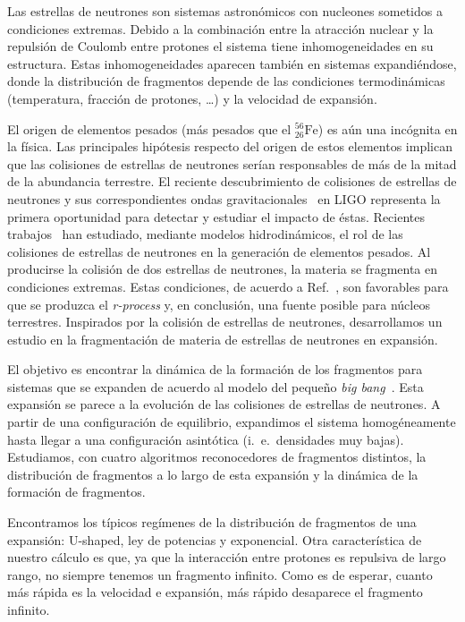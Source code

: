 Las estrellas de neutrones son sistemas astronómicos con nucleones sometidos a condiciones extremas.
Debido a la combinación entre la atracción nuclear y la repulsión de Coulomb entre protones el sistema tiene inhomogeneidades en su estructura.
Estas inhomogeneidades aparecen también en sistemas expandiéndose, donde la distribución de fragmentos depende de las condiciones termodinámicas (temperatura, fracción de protones, \ldots) y la velocidad de expansión.

El origen de elementos pesados (más pesados que el $^{56}_{26}\text{Fe}$) es aún una incógnita en la física.
Las principales hipótesis respecto del origen de estos elementos implican que las colisiones de estrellas de neutrones serían responsables de más de la mitad de la abundancia terrestre.
El reciente descubrimiento de colisiones de estrellas de neutrones y sus correspondientes ondas gravitacionales~\cite{ligo_scientific_collaboration_and_virgo_collaboration_gw170817:_2017} en LIGO representa la primera oportunidad para detectar y estudiar el impacto de éstas.
Recientes trabajos~\cite{kasen_origin_2017} han estudiado, mediante modelos hidrodinámicos, el rol de las colisiones de estrellas de neutrones en la generación de elementos pesados.
Al producirse la colisión de dos estrellas de neutrones, la materia se fragmenta en condiciones extremas.
Estas condiciones, de acuerdo a Ref.~\cite{lattimer_black-hole-neutron-star_1974}, son favorables para que se produzca el \emph{r-process} y, en conclusión, una fuente posible para núcleos terrestres.
Inspirados por la colisión de estrellas de neutrones, desarrollamos un estudio en la fragmentación de materia de estrellas de neutrones en expansión.

El objetivo es encontrar la dinámica de la formación de los fragmentos para sistemas que se expanden de acuerdo al modelo del pequeño \emph{big bang}~\cite{dorso_onset_1996}.
Esta expansión se parece a la evolución de las colisiones de estrellas de neutrones.
A partir de una configuración de equilibrio, expandimos el sistema homogéneamente hasta llegar a una configuración asintótica (i.\ e.\ densidades muy bajas).
Estudiamos, con cuatro algoritmos reconocedores de fragmentos distintos, la distribución de fragmentos a lo largo de esta expansión y la dinámica de la formación de fragmentos.

Encontramos los típicos regímenes de la distribución de fragmentos de una expansión: U-shaped, ley de potencias y exponencial.
Otra característica de nuestro cálculo es que, ya que la interacción entre protones es repulsiva de largo rango, no siempre tenemos un fragmento infinito.
Como es de esperar, cuanto más rápida es la velocidad e expansión, más rápido desaparece el fragmento infinito.

